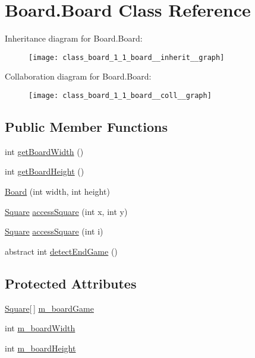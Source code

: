 \hypertarget{class_board_1_1_board}{}\section{Board.\+Board Class Reference}
\label{class_board_1_1_board}


Inheritance diagram for Board.\+Board\+:
\nopagebreak
\begin{figure}[H]
\begin{center}
\leavevmode
\texttt{[image: class\_board\_1\_1\_board\_\_inherit\_\_graph]}
\end{center}
\end{figure}


Collaboration diagram for Board.\+Board\+:
\nopagebreak
\begin{figure}[H]
\begin{center}
\leavevmode
\texttt{[image: class\_board\_1\_1\_board\_\_coll\_\_graph]}
\end{center}
\end{figure}
\subsection*{Public Member Functions}
\begin{DoxyCompactItemize}
\item 
int \hyperlink{class_board_1_1_board_a2eac3ef13d90ea0dfdc2c198bcab030d}{get\+Board\+Width} ()
\item 
int \hyperlink{class_board_1_1_board_a76b63d4d319e6a0f9f574a3fa8e5d00b}{get\+Board\+Height} ()
\item 
\hyperlink{class_board_1_1_board_a346819dc6f781a6a6c03a2bf8219e1e0}{Board} (int width, int height)
\item 
\hyperlink{class_square_1_1_square}{Square} \hyperlink{class_board_1_1_board_a279f8936c2da2be7c0c12d61212a7591}{access\+Square} (int x, int y)
\item 
\hyperlink{class_square_1_1_square}{Square} \hyperlink{class_board_1_1_board_aa2e9404b4c5fa4b7c22376610f172da8}{access\+Square} (int i)
\item 
abstract int \hyperlink{class_board_1_1_board_a1e4af7a26127d7f715c9df3d058ac97e}{detect\+End\+Game} ()
\end{DoxyCompactItemize}
\subsection*{Protected Attributes}
\begin{DoxyCompactItemize}
\item 
\hyperlink{class_square_1_1_square}{Square}\mbox{[}$\,$\mbox{]} \hyperlink{class_board_1_1_board_aede8ecf481e3981e0ec04d7bd3520bea}{m\+\_\+board\+Game}
\item 
int \hyperlink{class_board_1_1_board_a811ddc59658729b3cdb0a2db75465334}{m\+\_\+board\+Width}
\item 
int \hyperlink{class_board_1_1_board_a4a513d0963fd4e135fac9d121aea3a98}{m\+\_\+board\+Height}
\end{DoxyCompactItemize}


